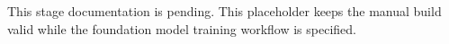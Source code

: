 \documentclass[11pt]{article}
\begin{document}
\label{docstart:foundation_model_training}

This stage documentation is pending. This placeholder keeps the manual build
valid while the foundation model training workflow is specified.
\end{document}

